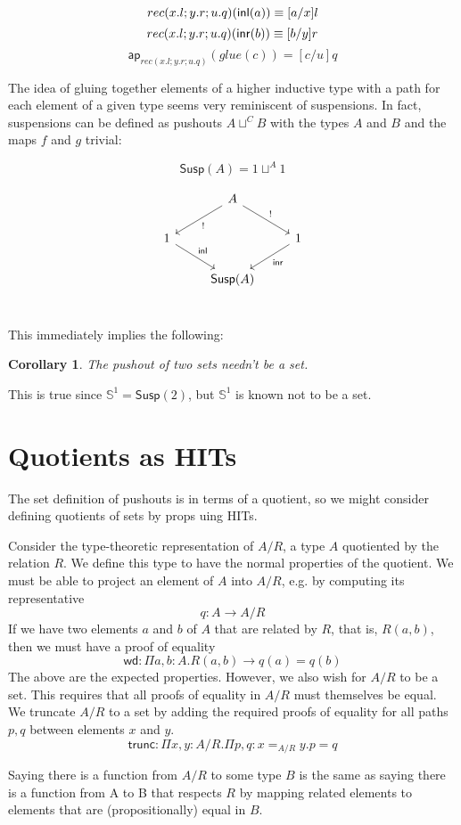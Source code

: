 \documentclass[11pt]{article}
\renewcommand{\SS}{\mathbb{S}}
\newcommand*{\ap}{\mathsf{ap}}
\newcommand{\susp}[1]{\mathsf{Susp}(#1)}
\newtheorem{cor}{Corollary}
\begin{document}
$$rec(x.l; y.r; u.q)({\mathsf{inl}}(a)) \equiv [a/x]l$$
$$rec(x.l; y.r; u.q)({\mathsf{inr}}(b)) \equiv [b/y]r$$
$$\ap_{rec(x.l; y.r; u.q)}(glue(c)) = [c/u]q$$

The idea of gluing together elements of a higher inductive type with a path
for each element of a given type seems very reminiscent of suspensions. In
fact, suspensions can be defined as pushouts $A \sqcup^C B$ with the types
$A$ and $B$ and the maps $f$ and $g$ trivial:

$$\susp A = 1 \sqcup^A 1$$

\begin{equation*}
\begin{tikzcd}
{} & A \arrow{dr}{!} \arrow{dl}{!} & {}\\
1 \arrow{dr}{\inl} & {} & 1 \arrow{dl}{\inr} \\
{} & \susp{A} & {}\\
\end{tikzcd}
\end{equation*}

This immediately implies the following:
\begin{cor}The pushout of two sets needn't be a set.\end{cor}
This is true since $\SS^1 = \susp{2}$, but $\SS^1$ is known not to be a set.


\section{Quotients as HITs}
\newcommand{\trunc}{\mathsf{trunc}}
The set definition of pushouts is in terms of a quotient, so we might
consider defining quotients of sets by props uing HITs.

Consider the type-theoretic representation of $A/R$, a type $A$ quotiented
by the relation $R$. We define this type to have the normal properties of the
quotient. We must be able to project an element of $A$ into $A/R$, e.g. by
computing its representative
$$q : A \to A/R$$
If we have two elements $a$ and $b$ of $A$ that are related by $R$, that is,
$R(a, b)$, then we must have a proof of equality
$$\mathsf{wd}: \Pi a,b: A. R(a,b) \to q(a) = q(b)$$
The above are the expected properties. However, we also wish for
$A/R$ to be a set. This requires that all proofs of equality in $A/R$ must
themselves be equal. We truncate $A/R$ to a set by adding the required proofs
of equality for all paths $p, q$ between elements $x$ and $y$.
$$\trunc : \Pi x,y: A/R. \Pi p, q : x =_{A/R} y. p = q$$

Saying there is a function from $A/R$ to some type $B$ is the same as saying there is a function from A to B that respects $R$ by mapping related elements
to elements that are (propositionally) equal in $B$.
\end{document}
